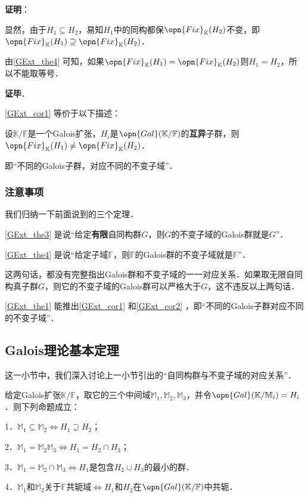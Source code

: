 \textbf{证明}：

显然，由于$H_1\subseteq H_2$，易知$H_1$中的同构都保$\opn{Fix}_\mathbb{K}(H_2)$不变，即$\opn{Fix}_\mathbb{K}(H_1)\supseteq \opn{Fix}_\mathbb{K}(H_2)$．

由\autoref{GExt_the4} 可知，如果$\opn{Fix}_\mathbb{K}(H_1)= \opn{Fix}_\mathbb{K}(H_2)$则$H_1=H_2$，所以不能取等号．

\textbf{证毕}．

\autoref{GExt_cor1} 等价于以下描述：

\begin{corollary}{}\label{GExt_cor2}
设$\mathbb{K}/\mathbb{F}$是一个Galois扩张，$H_i$是$\opn{Gal}(\mathbb{K}/\mathbb{F})$的\textbf{互异}子群，则$\opn{Fix}_\mathbb{K}(H_1)\neq \opn{Fix}_\mathbb{K}(H_2)$．
\end{corollary}

即“不同的Galois子群，对应不同的不变子域”．


\subsubsection{注意事项}

我们归纳一下前面说到的三个定理．

\autoref{GExt_the3} 是说“给定\textbf{有限}自同构群$G$，则$G$的不变子域的Galois群就是$G$”．

\autoref{GExt_the4} 是说“给定子域$\mathbb{F}$，则$\mathbb{F}$的Galois群的不变子域就是$\mathbb{F}$”．


这两句话，都没有完整指出Galois群和不变子域的一一对应关系．如果取无限自同构真子群$G$，则它的不变子域的Galois群可以严格大于$G$，这不违反以上两句话．


\autoref{GExt_the1} 能推出\autoref{GExt_cor1} 和\autoref{GExt_cor2} ，即“不同的Galois子群对应不同的不变子域”．






\subsection{Galois理论基本定理}

这一小节中，我们深入讨论上一小节引出的“自同构群与不变子域的对应关系”．

\begin{theorem}{}
给定Galois扩张$\mathbb{K}/\mathbb{F}$，取它的三个中间域$\mathbb{M}_1, \mathbb{M}_2, \mathbb{M}_3$，并令$\opn{Gal}(\mathbb{K}/\mathbb{M}_i)=H_i$．则下列命题成立：

1．$\mathbb{M}_1\subseteq \mathbb{M}_2 \iff H_1\supseteq H_2$；

2．$\mathbb{M}_1=\mathbb{M}_2\mathbb{M}_3 \iff H_1=H_2\cap H_3$；

3．$\mathbb{M}_1=\mathbb{M}_2\cap\mathbb{M}_3 \iff H_1$是包含$H_2\cup H_3$的最小的群．

4．$\mathbb{M}_1$和$\mathbb{M}_2$关于$\mathbb{F}$共轭域$\iff H_1$和$H_2$在$\opn{Gal}(\mathbb{K}/\mathbb{F})$中共轭．

\end{theorem}

